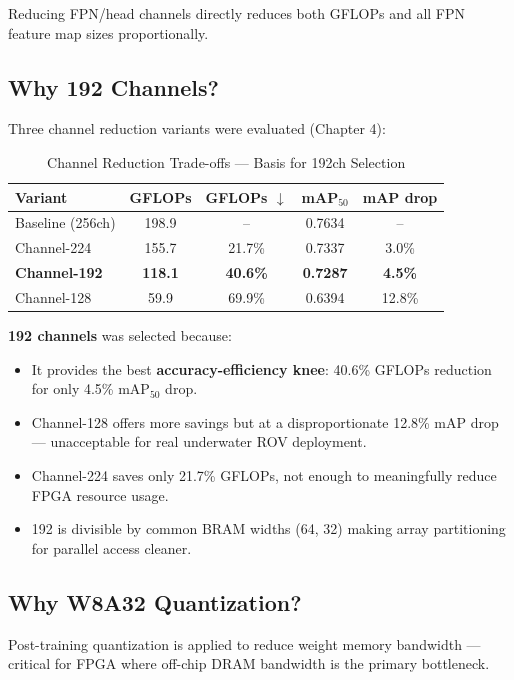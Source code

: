 Reducing FPN/head channels directly reduces both GFLOPs and all FPN feature map sizes proportionally.

\subsection{Why 192 Channels?}

Three channel reduction variants were evaluated (Chapter 4):

\begin{table}[H]
\centering
\caption{Channel Reduction Trade-offs — Basis for 192ch Selection}
\begin{tabular}{|l|c|c|c|c|}
\hline
\textbf{Variant} & \textbf{GFLOPs} & \textbf{GFLOPs $\downarrow$} & \textbf{mAP$_{50}$} & \textbf{mAP drop} \\
\hline
Baseline (256ch) & 198.9 & --     & 0.7634 & -- \\
Channel-224      & 155.7 & 21.7\% & 0.7337 & 3.0\% \\
\textbf{Channel-192} & \textbf{118.1} & \textbf{40.6\%} & \textbf{0.7287} & \textbf{4.5\%} \\
Channel-128      &  59.9 & 69.9\% & 0.6394 & 12.8\% \\
\hline
\end{tabular}
\label{table:ch_selection}
\end{table}

\textbf{192 channels} was selected because:
\begin{itemize}
    \item It provides the best \textbf{accuracy-efficiency knee}: 40.6\% GFLOPs reduction for only 4.5\% mAP$_{50}$ drop.
    \item Channel-128 offers more savings but at a disproportionate 12.8\% mAP drop — unacceptable for real underwater ROV deployment.
    \item Channel-224 saves only 21.7\% GFLOPs, not enough to meaningfully reduce FPGA resource usage.
    \item 192 is divisible by common BRAM widths (64, 32) making array partitioning for parallel access cleaner.
\end{itemize}

\subsection{Why W8A32 Quantization?}

Post-training quantization is applied to reduce weight memory bandwidth — critical for FPGA where off-chip DRAM bandwidth is the primary bottleneck.

